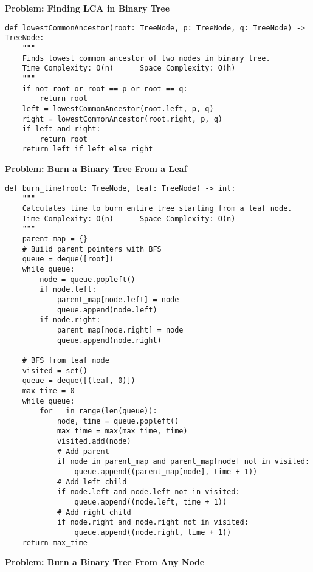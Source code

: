 \noindent\textbf{Problem: Finding LCA in Binary Tree}
\begin{verbatim}
def lowestCommonAncestor(root: TreeNode, p: TreeNode, q: TreeNode) -> TreeNode:
    """
    Finds lowest common ancestor of two nodes in binary tree.
    Time Complexity: O(n)      Space Complexity: O(h)
    """
    if not root or root == p or root == q:
        return root
    left = lowestCommonAncestor(root.left, p, q)
    right = lowestCommonAncestor(root.right, p, q)
    if left and right:
        return root
    return left if left else right
\end{verbatim}
\noindent\textbf{Problem: Burn a Binary Tree From a Leaf}
\begin{verbatim}
def burn_time(root: TreeNode, leaf: TreeNode) -> int:
    """
    Calculates time to burn entire tree starting from a leaf node.
    Time Complexity: O(n)      Space Complexity: O(n)
    """
    parent_map = {}
    # Build parent pointers with BFS
    queue = deque([root])
    while queue:
        node = queue.popleft()
        if node.left:
            parent_map[node.left] = node
            queue.append(node.left)
        if node.right:
            parent_map[node.right] = node
            queue.append(node.right)
    
    # BFS from leaf node
    visited = set()
    queue = deque([(leaf, 0)])
    max_time = 0
    while queue:
        for _ in range(len(queue)):
            node, time = queue.popleft()
            max_time = max(max_time, time)
            visited.add(node)
            # Add parent
            if node in parent_map and parent_map[node] not in visited:
                queue.append((parent_map[node], time + 1))
            # Add left child
            if node.left and node.left not in visited:
                queue.append((node.left, time + 1))
            # Add right child
            if node.right and node.right not in visited:
                queue.append((node.right, time + 1))
    return max_time
\end{verbatim}
\noindent\textbf{Problem: Burn a Binary Tree From Any Node}
